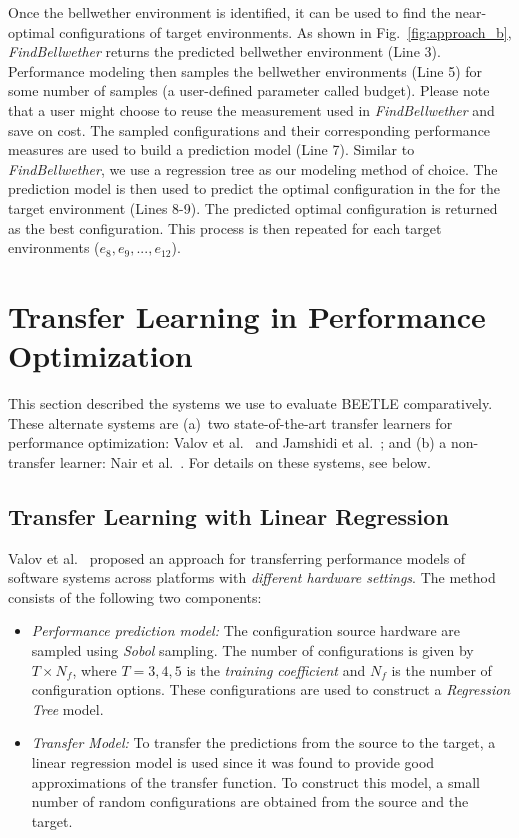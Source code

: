 \documentclass[10pt,journal,compsoc]{IEEEtran}
\newcommand{\bi}{\begin{itemize}}
\newcommand{\ei}{\end{itemize}}
\begin{document}
Once the bellwether environment is identified, it can be used to find the near-optimal configurations of target environments. As shown in Fig.~\ref{fig:approach_b},   \textit{FindBellwether} returns the predicted bellwether environment (Line 3). Performance modeling then samples the bellwether environments (Line 5) for some number of samples (a user-defined parameter called budget).
Please note that a user might choose to reuse the measurement used in \textit{FindBellwether} and save on cost. The sampled configurations and their corresponding performance measures are used to build a prediction model (Line 7). Similar to \textit{FindBellwether}, we use a regression tree as our modeling method of choice. The prediction model is then used to predict the optimal configuration in the for the target environment (Lines 8-9). The predicted optimal configuration is returned as the best configuration. This process is then repeated for each target environments ($e_8, e_9,..., e_{12}$).



\vspace{-0.1cm}
\section{Transfer Learning in Performance Optimization}
\label{sect:tl}

This section described the systems we use to evaluate  BEETLE comparatively.
These alternate systems are   (a)~two state-of-the-art transfer learners for performance optimization: Valov et al.~\cite{van2017automatic} and Jamshidi et al.~\cite{jamshidi2017transfer}; and (b) a non-transfer learner: Nair et al.~\cite{nair2017using}. For details on these systems, see below.


\vspace{-0.2cm}
\subsection{Transfer Learning with Linear Regression}

Valov et al.~\cite{valov2017transferring} proposed an approach for transferring performance models of software systems across platforms with \textit{different hardware settings}. The method consists of the following two components: 
\bi
\item \textit{Performance prediction model:} The configuration source hardware are sampled using \textit{Sobol} sampling. The number of configurations is given by $T\times N_f$, where $T={3, 4, 5}$ is the \textit{training coefficient} and $N_f$ is the number of configuration options. These configurations are used to construct a \textit{Regression Tree} model.
\item \textit{Transfer Model:} To transfer the predictions from the source to the target, a linear regression model is used since it was found to provide good approximations of the transfer function. To construct this model, a small number of random configurations are obtained from the source and the target. 
\ei
\end{document}
